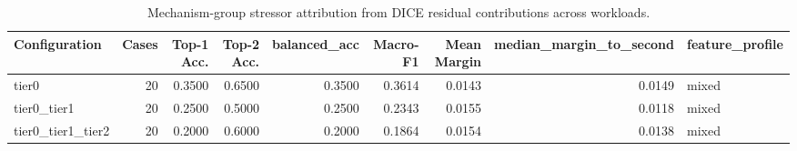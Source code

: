 \begin{table}[t]
\centering
\caption{Mechanism-group stressor attribution from DICE residual contributions across workloads.}
\label{tab:dice_stressor_diagnosis}
\footnotesize
\begin{tabular}{lrrrrrrrl}
\toprule
Configuration & Cases & Top-1 Acc. & Top-2 Acc. & balanced_acc & Macro-F1 & Mean Margin & median_margin_to_second & feature_profile \\
\midrule
tier0 & 20 & 0.3500 & 0.6500 & 0.3500 & 0.3614 & 0.0143 & 0.0149 & mixed \\
tier0_tier1 & 20 & 0.2500 & 0.5000 & 0.2500 & 0.2343 & 0.0155 & 0.0118 & mixed \\
tier0_tier1_tier2 & 20 & 0.2000 & 0.6000 & 0.2000 & 0.1864 & 0.0154 & 0.0138 & mixed \\
\bottomrule
\end{tabular}

\end{table}
